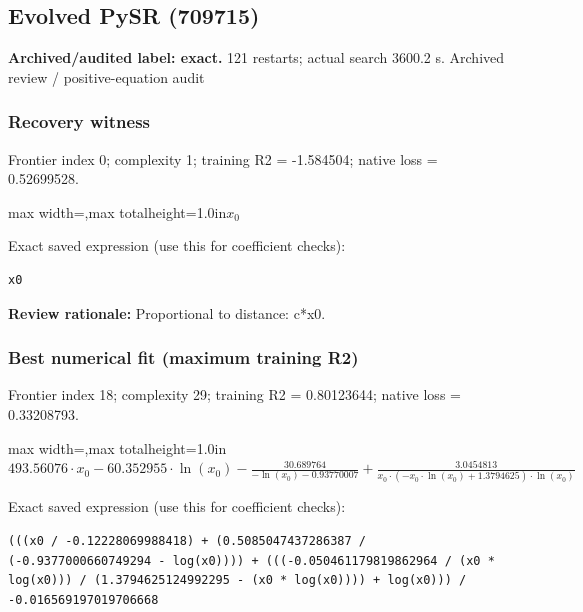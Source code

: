 \documentclass[10pt,letterpaper,landscape]{article}
\begin{document}
\begin{minipage}[t]{0.485\textwidth}
\subsection*{Evolved PySR (709715)}
\textbf{Archived/audited label: exact.} 121 restarts; actual search 3600.2 s.
{\small Archived review / positive-equation audit}
\subsubsection*{Recovery witness}
Frontier index 0; complexity 1; training R2 = -1.584504; native loss = 0.52699528.
\begin{center}\begin{adjustbox}{max width=\linewidth,max totalheight=1.0in}$\displaystyle x_{0}$\end{adjustbox}\end{center}
{\scriptsize Exact saved expression (use this for coefficient checks):}
\begin{lstlisting}
x0
\end{lstlisting}
{\small\textbf{Review rationale:} Proportional to distance: c*x0.}
\subsubsection*{Best numerical fit (maximum training R2)}
Frontier index 18; complexity 29; training R2 = 0.80123644; native loss = 0.33208793.
\begin{center}\begin{adjustbox}{max width=\linewidth,max totalheight=1.0in}$\displaystyle 493.56076 \cdot x_{0} - 60.352955 \cdot \ln{\left(x_{0} \right)} - \frac{30.689764}{- \ln{\left(x_{0} \right)} - 0.93770007} + \frac{3.0454813}{x_{0} \cdot \left(- x_{0} \cdot \ln{\left(x_{0} \right)} + 1.3794625\right) \cdot \ln{\left(x_{0} \right)}}$\end{adjustbox}\end{center}
{\scriptsize Exact saved expression (use this for coefficient checks):}
\begin{lstlisting}
(((x0 / -0.12228069988418) + (0.5085047437286387 / (-0.9377000660749294 - log(x0)))) + (((-0.050461179819862964 / (x0 * log(x0))) / (1.3794625124992295 - (x0 * log(x0)))) + log(x0))) / -0.016569197019706668
\end{lstlisting}
\end{minipage}
\clearpage{}\label{hubble-10009}
\end{document}
